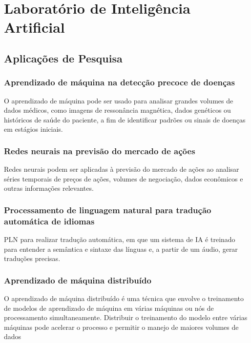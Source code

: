 \section{Laboratório de Inteligência Artificial}

\subsection{Aplicações de Pesquisa}

\subsubsection{Aprendizado de máquina na detecção precoce de doenças}

O aprendizado de máquina pode ser usado para analisar grandes volumes de dados médicos, como imagens de ressonância magnética, dados genéticos ou históricos de saúde do paciente, a fim de identificar padrões ou sinais de doenças em estágios iniciais.

\subsubsection{Redes neurais na previsão do mercado de ações}

Redes neurais podem ser aplicadas à previsão do mercado de ações ao analisar séries temporais de preços de ações, volumes de negociação, dados econômicos e outras informações relevantes.

\subsubsection{Processamento de linguagem natural para tradução automática de idiomas}

PLN para realizar tradução automática, em que um sistema de IA é treinado para entender a semântica e sintaxe das línguas e, a partir de um áudio, gerar traduções precisas.

\subsubsection{Aprendizado de máquina distribuído}

O aprendizado de máquina distribuído é uma técnica que envolve o treinamento de modelos de aprendizado de máquina em várias máquinas ou nós de processamento simultaneamente. Distribuir o treinamento do modelo entre várias máquinas pode acelerar o processo e permitir o manejo de maiores volumes de dados

